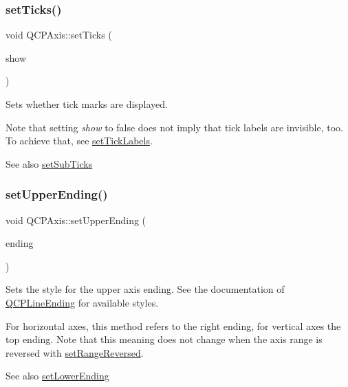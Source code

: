 \subsubsection{\texorpdfstring{set\+Ticks()}{setTicks()}}
{\footnotesize\ttfamily void Q\+C\+P\+Axis\+::set\+Ticks (\begin{DoxyParamCaption}\item[{bool}]{show }\end{DoxyParamCaption})}

Sets whether tick marks are displayed.

Note that setting {\itshape show} to false does not imply that tick labels are invisible, too. To achieve that, see \hyperlink{class_q_c_p_axis_a04ba16e1f6f78d70f938519576ed32c8}{set\+Tick\+Labels}.

\begin{DoxySeeAlso}{See also}
\hyperlink{class_q_c_p_axis_afa0ce8d4d0015ed23dcde01f8bc30106}{set\+Sub\+Ticks} 
\end{DoxySeeAlso}
\mbox{\label{class_q_c_p_axis_a69119b892fc306f651763596685aa377}} 
\subsubsection{\texorpdfstring{set\+Upper\+Ending()}{setUpperEnding()}}
{\footnotesize\ttfamily void Q\+C\+P\+Axis\+::set\+Upper\+Ending (\begin{DoxyParamCaption}\item[{const \hyperlink{class_q_c_p_line_ending}{Q\+C\+P\+Line\+Ending} \&}]{ending }\end{DoxyParamCaption})}

Sets the style for the upper axis ending. See the documentation of \hyperlink{class_q_c_p_line_ending}{Q\+C\+P\+Line\+Ending} for available styles.

For horizontal axes, this method refers to the right ending, for vertical axes the top ending. Note that this meaning does not change when the axis range is reversed with \hyperlink{class_q_c_p_axis_a2172fdb196b1a0dc3f40992fcad8e9e1}{set\+Range\+Reversed}.

\begin{DoxySeeAlso}{See also}
\hyperlink{class_q_c_p_axis_a08af1c72db9ae4dc8cb8a973d44405ab}{set\+Lower\+Ending} 
\end{DoxySeeAlso}
\mbox{\label{class_q_c_p_axis_a7b7a27151be8235059e1294f73ecf615}} 
